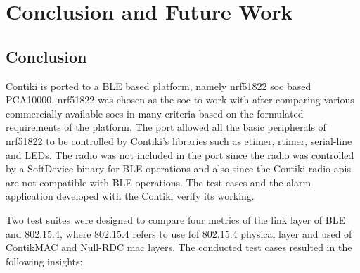 \chapter{Conclusion and Future Work} \label{9ConcFuture}
\section{Conclusion}

Contiki is ported to a BLE based platform, namely nrf51822 \gls{soc} based PCA10000. nrf51822 was chosen as the \gls{soc} to work with after comparing various commercially available \glspl{soc} in many criteria based on the formulated requirements of the platform. The port allowed all the basic peripherals of nrf51822 to be controlled by Contiki's libraries such as etimer, rtimer, serial-line and LEDs.  The radio was not included in the port since the radio was controlled by a SoftDevice binary for BLE operations and also since the Contiki radio \glspl{api} are not compatible with BLE operations. The test cases and the alarm application developed with the Contiki verify its working.

Two test suites were designed to compare four metrics of the link layer of BLE and 802.15.4, where 802.15.4 refers to use fof 802.15.4 physical layer and used of ContikMAC and Null-RDC \gls{mac} layers. The conducted test cases resulted in the following insights:

